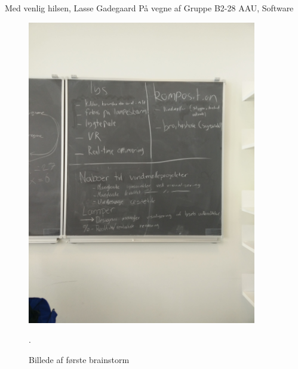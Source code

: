 \documentclass[oneside,a4paper,titlepage]{article}
\begin{document}
Med venlig hilsen,\newline
Lasse Gadegaard\newline
På vegne af\newline
Gruppe B2-28\newline
AAU, Software

\begin{figure}[H]
   \centering
   \includegraphics[width=10cm]{../graphics/brainstorm_1}
   \caption{Billede af første brainstorm}.
\end{figure}
\end{document}
